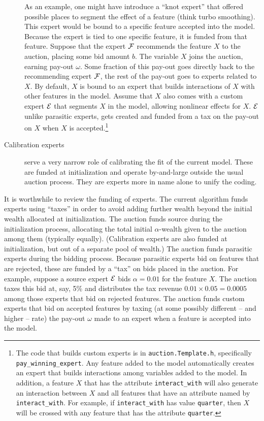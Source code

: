 \documentclass[12pt]{article}
\begin{document}
\begin{description}
 As an example, one might have introduce a ``knot expert'' that offered possible
 places to segment the effect of a feature (think turbo smoothing).  This expert
 would be bound to a specific feature accepted into the model.  Because the
 expert is tied to one specific feature, it is funded from that feature.
  Suppose that the expert $\cal F$ recommends the feature $X$ to the auction,
 placing some bid amount $b$.  The variable $X$ joins the auction, earning
 pay-out $\omega$.  Some fraction of this pay-out goes directly back to the
 recommending expert $\cal F$, the rest of the pay-out goes to experts related to
 $X$.  By default, $X$ is bound to an expert that builds interactions of $X$
 with other features in the model.  Assume that $X$ also comes with a custom
 expert $\cal E$ that segments $X$ in the model, allowing nonlinear effects for
 $X$.  $\cal E$ unlike parasitic experts, gets created and funded from a tax on
 the pay-out on $X$ when $X$ is accepted.\footnote{The code that builds custom
 experts is in {\tt auction.Template.h}, specifically {\tt
 pay\_winning\_expert}.  Any feature added to the model automatically creates an
 expert that builds interactions among variables added to the model. In
 addition, a feature $X$ that has the attribute {\tt interact\_with} will also
 generate an interaction between $X$ and all features that have an attribute
 named by {\tt interact\_with}.  For example, if {\tt interact\_with} has value
 {\tt quarter}, then $X$ will be crossed with any feature that has the attribute
 {\tt quarter}.}

\item[Calibration experts] serve a very narrow role of calibrating the fit of
 the current model.  These are funded at initialization and operate by-and-large
 outside the usual auction process.  They are experts more in name alone to
 unify the coding.
\end{description}


 It is worthwhile to review the funding of experts.  The current algorithm funds
 experts using ``taxes'' in order to avoid adding further wealth beyond the
 initial wealth allocated at initialization.  The auction funds source during
 the initialization process, allocating the total initial $\alpha$-wealth given
 to the auction among them (typically equally).  (Calibration experts are also
 funded at initialization, but out of a separate pool of wealth.)  The auction
 funds parasitic experts during the bidding process.  Because parasitic experts
 bid on features that are rejected, these are funded by a ``tax'' on bids placed
 in the auction.  For example, suppose a source expert $\cal E$ bids $\alpha =
 0.01$ for the feature $X$. The auction taxes this bid at, say, 5\% and
 distributes the tax revenue $0.01 \times 0.05 = 0.0005$ among those experts
 that bid on rejected features.  The auction funds custom experts that bid on
 accepted features by taxing (at some possibly different -- and higher -- rate)
 the pay-out $\omega$ made to an expert when a feature is accepted into the
 model.
\end{document}
